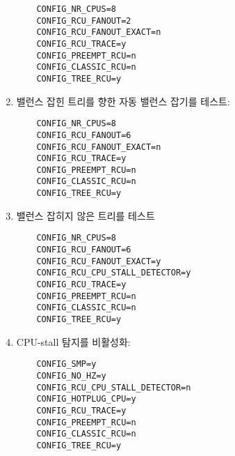 \begin{enumerate}
\vspace{5pt}
\begin{minipage}[t]{\columnwidth}
\scriptsize
\begin{verbatim}
	CONFIG_NR_CPUS=8
	CONFIG_RCU_FANOUT=2
	CONFIG_RCU_FANOUT_EXACT=n
	CONFIG_RCU_TRACE=y
	CONFIG_PREEMPT_RCU=n
	CONFIG_CLASSIC_RCU=n
	CONFIG_TREE_RCU=y
\end{verbatim}
\end{minipage}
\vspace{5pt}

\item	밸런스 잡힌 트리를 향한 자동 밸런스 잡기를 테스트:
\iffalse

\item	Test autobalancing to a balanced tree:
\fi

\vspace{5pt}
\begin{minipage}[t]{\columnwidth}
\scriptsize
\begin{verbatim}
	CONFIG_NR_CPUS=8
	CONFIG_RCU_FANOUT=6
	CONFIG_RCU_FANOUT_EXACT=n
	CONFIG_RCU_TRACE=y
	CONFIG_PREEMPT_RCU=n
	CONFIG_CLASSIC_RCU=n
	CONFIG_TREE_RCU=y
\end{verbatim}
\end{minipage}
\vspace{5pt}

\item	밸런스 잡히지 않은 트리를 테스트
\iffalse

\item	Test unbalanced tree:
\fi

\vspace{5pt}
\begin{minipage}[t]{\columnwidth}
\scriptsize
\begin{verbatim}
	CONFIG_NR_CPUS=8
	CONFIG_RCU_FANOUT=6
	CONFIG_RCU_FANOUT_EXACT=y
	CONFIG_RCU_CPU_STALL_DETECTOR=y
	CONFIG_RCU_TRACE=y
	CONFIG_PREEMPT_RCU=n
	CONFIG_CLASSIC_RCU=n
	CONFIG_TREE_RCU=y
\end{verbatim}
\end{minipage}
\vspace{5pt}

\item	CPU-stall 탐지를 비활성화:
\iffalse

\item	Disable CPU-stall detection:
\fi

\vspace{5pt}
\begin{minipage}[t]{\columnwidth}
\scriptsize
\begin{verbatim}
	CONFIG_SMP=y
	CONFIG_NO_HZ=y
	CONFIG_RCU_CPU_STALL_DETECTOR=n
	CONFIG_HOTPLUG_CPU=y
	CONFIG_RCU_TRACE=y
	CONFIG_PREEMPT_RCU=n
	CONFIG_CLASSIC_RCU=n
	CONFIG_TREE_RCU=y
\end{verbatim}
\end{minipage}
\vspace{5pt}


\end{enumerate}
